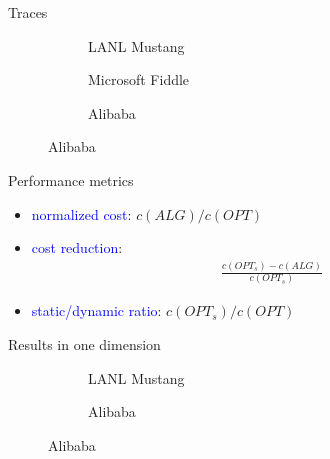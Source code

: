 \documentclass{beamer}
\def\b{\textcolor{blue}}
\begin{document}
\begin{frame}{Traces}
\begin{figure}
    \begin{subfigure}[b]{.4\linewidth}
    \resizebox{\textwidth}{!}{}
    \caption{LANL Mustang}
    \end{subfigure}
    \begin{subfigure}[b]{.35\linewidth}
    \resizebox{\textwidth}{!}{}
    \caption{Microsoft Fiddle}
    \end{subfigure}
    \par\bigskip
    \begin{subfigure}[b]{.38\linewidth}
    \resizebox{\textwidth}{!}{}
    \caption{Alibaba}
    \end{subfigure}
\end{figure}
\end{frame}

\begin{frame}{Performance metrics}
\begin{itemize}
    \item \b{normalized cost}: $c(ALG) / c(OPT)$\pause
    \item \b{cost reduction}: \begin{align*}
        \frac{c(OPT_s) - c(ALG)}{c(OPT_s)}
    \end{align*}\pause
    \item \b{static/dynamic ratio}: $c(OPT_s) / c(OPT)$
\end{itemize}
\end{frame}

\begin{frame}{Results in one dimension}
\begin{figure}
    \begin{subfigure}[b]{.50\linewidth}
    \resizebox{\textwidth}{!}{}
    \caption{LANL Mustang}
    \end{subfigure}
    \begin{subfigure}[b]{.48\linewidth}
    \resizebox{\textwidth}{!}{}
    \caption{Alibaba}
    \end{subfigure}
\end{figure}
\end{frame}
\end{document}
